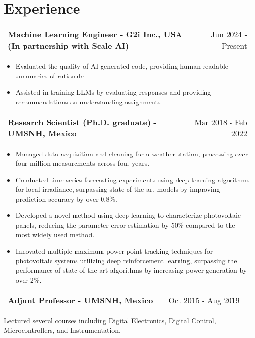 \documentclass[a4paper,10pt]{article}
\makeatletter
\newenvironment{jobshort}[2]
    {
    \begin{tabularx}{\linewidth}{@{}l X r@{}}
    \textbf{#1} & \hfill &  #2 \\[3.75pt]
    \end{tabularx}
    }
    {
    }
\newenvironment{joblong}[2]
    {
    \begin{tabularx}{\linewidth}{@{}l X r@{}}
    \textbf{#1} & \hfill &  #2 \\[3.75pt]
    \end{tabularx}
    \begin{minipage}[t]{\linewidth}
    \begin{itemize}[nosep,after=\strut, leftmargin=1em, itemsep=3pt,label=--]
    }
    {
    \end{itemize}
    \end{minipage}    
    }
\makeatother
\begin{document}
\section{Experience}

\begin{joblong}{Machine Learning Engineer - G2i Inc., USA (In partnership with Scale AI)}{Jun 2024 - Present}
    \item Evaluated the quality of AI-generated code, providing human-readable summaries of rationale.
    \item Assisted in training LLMs by evaluating responses and providing recommendations on understanding assignments.
\end{joblong}

\begin{joblong}{Research Scientist (Ph.D. graduate) - UMSNH, Mexico}{Mar 2018 - Feb 2022}
\item Managed data acquisition and cleaning for a weather station, processing over four million measurements across four years.
\item Conducted time series forecasting experiments using deep learning algorithms for local irradiance, surpassing state-of-the-art models by improving prediction accuracy by over 0.8\%.
\item Developed a novel method using deep learning to characterize photovoltaic panels, reducing the parameter error estimation by 50\% compared to the most widely used method.
\item Innovated multiple maximum power point tracking techniques for photovoltaic systems utilizing deep reinforcement learning, surpassing the performance of state-of-the-art algorithms by increasing power generation by over 2\%.
\end{joblong}

\begin{jobshort}{Adjunt Professor - UMSNH, Mexico}{Oct 2015 - Aug 2019}
Lectured several courses including Digital Electronics, Digital Control, Microcontrollers, and Instrumentation.
\end{jobshort}
\end{document}
